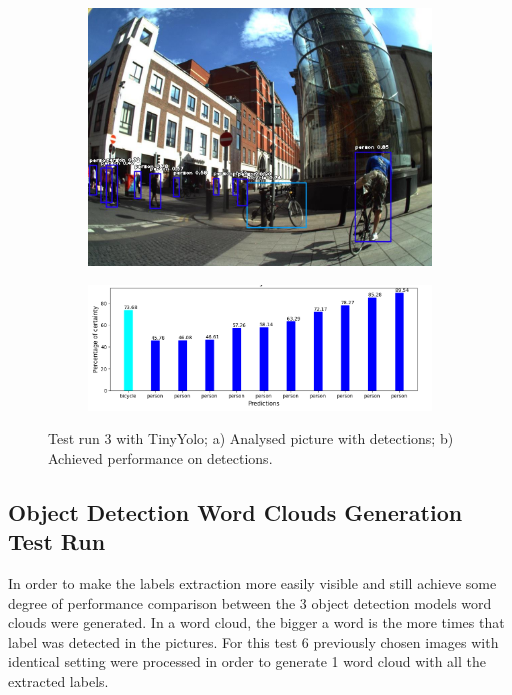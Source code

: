           \begin{figure}[H]
            \centering
            \captionsetup{justification=centering}
    
            \begin{subfigure}{0.29\textwidth}
            \includegraphics[width=\textwidth]{Sections/4InitialWork/4_images_obj_run4/yolo_tiny.jpg} 
            \caption{}
            \end{subfigure}
            \begin{subfigure}{0.65\textwidth}
            \includegraphics[width=\textwidth]{Sections/4InitialWork/4_images_obj_run4/tiny_yolo_graph.png}
            \caption{}
            \end{subfigure}
            
            \caption[Test run 3 with TinyYolo]{ 
            Test run 3 with TinyYolo; a) Analysed picture with detections; b) Achieved performance on detections. }
            \end{figure}


    \newpage

    \subsection{Object Detection Word Clouds Generation Test Run}
    \label{ch:wordclouds}
    In order to make the labels extraction more easily visible and still achieve some degree of performance comparison between the 3 object detection models word clouds were generated. In a word cloud, the bigger a word is the more times that label was detected in the pictures. For this test 6 previously chosen images with identical setting were processed in order to generate 1 word cloud with all the extracted labels.

